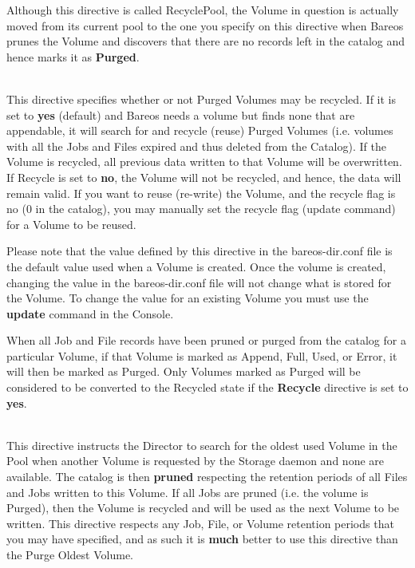 \begin{description}
Although this directive is called RecyclePool, the Volume in
question is actually moved from its current pool to the one
you specify on this directive when Bareos prunes the Volume and
discovers that there are no records left in the catalog and hence
marks it as {\bf Purged}.

\label{PoolRecycle}
\item [Recycle = {\textless}yes{\textbar}no{\textgreater}] \hfill \\
This directive specifies whether or not Purged Volumes may be recycled.
If it is set to {\bf yes} (default) and Bareos needs a volume but finds
none that are appendable, it will search for and recycle (reuse) Purged
Volumes (i.e.  volumes with all the Jobs and Files expired and thus
deleted from the Catalog).  If the Volume is recycled, all previous data
written to that Volume will be overwritten. If Recycle is set to {\bf
no}, the Volume will not be recycled, and hence, the data will remain
valid.  If you want to reuse (re-write) the Volume, and the recycle flag
is no (0 in the catalog), you may manually set the recycle flag (update
command) for a Volume to be reused.

Please note that the value defined by this directive in the
bareos-dir.conf file is the default value used when a Volume is created.
Once the volume is created, changing the value in the bareos-dir.conf
file will not change what is stored for the Volume.  To change the value
for an existing Volume you must use the {\bf update} command in the
Console.

When all Job and File records have been pruned or purged from the
catalog for a particular Volume, if that Volume is marked as
Append, Full, Used, or Error, it will then be marked as Purged. Only
Volumes marked as Purged will be considered to be converted to the
Recycled state if the {\bf Recycle} directive is set to {\bf yes}.

\label{RecycleOldest}
\item [Recycle Oldest Volume = {\textless}yes{\textbar}no{\textgreater}] \hfill \\
This directive instructs the Director to search for the oldest used
Volume in the Pool when another Volume is requested by the Storage
daemon and none are available.  The catalog is then {\bf pruned}
respecting the retention periods of all Files and Jobs written to this
Volume.  If all Jobs are pruned (i.e. the volume is Purged), then the
Volume is recycled and will be used as the next Volume to be written.
This directive respects any Job, File, or Volume retention periods that
you may have specified, and as such it is {\bf much} better to use this
directive than the Purge Oldest Volume.


\end{description}
